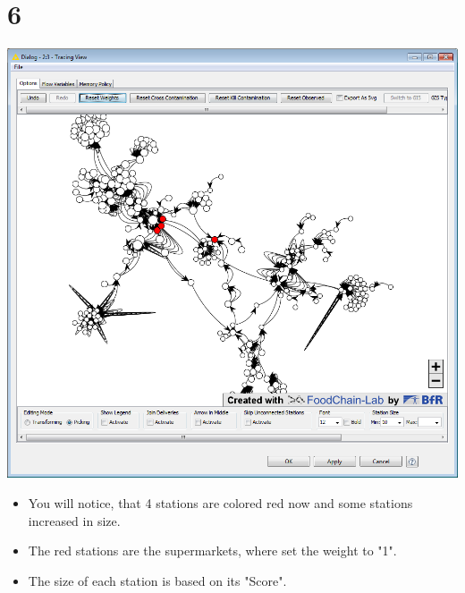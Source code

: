 \documentclass{beamer}
\begin{document}
\section{6}
\begin{frame}
	\begin{center}
  		\includegraphics[height=0.6\textheight]{6.png}
	\end{center}
	\begin{itemize}
		\item You will notice, that 4 stations are colored red now and some stations increased in size.
		\item The red stations are the supermarkets, where set the weight to "1".
		\item The size of each station is based on its "Score".
	\end{itemize}
\end{frame}
\end{document}
